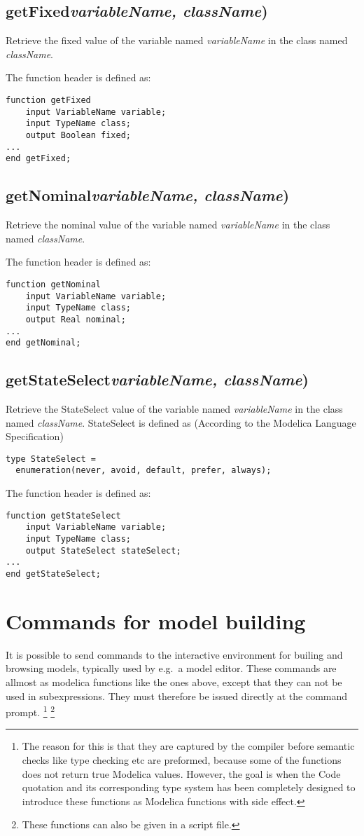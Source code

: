 \documentclass{report}
\newcommand{\func}[1]{\section{#1}}
\newcommand{\funcend}{}
\begin{document}
\func{getFixed\emph{variableName, className})}
Retrieve the fixed value of the variable named \emph{variableName} in the
class named \emph{className}. 

The function header is defined as:
\begin{verbatim}
function getFixed
    input VariableName variable;
    input TypeName class;
    output Boolean fixed;
...
end getFixed;
\end{verbatim}

\func{getNominal\emph{variableName, className})}
Retrieve the nominal value of the variable named \emph{variableName} in the
class named \emph{className}. 

The function header is defined as:
\begin{verbatim}
function getNominal
    input VariableName variable;
    input TypeName class;
    output Real nominal;
...
end getNominal;
\end{verbatim}

\func{getStateSelect\emph{variableName, className})}
Retrieve the StateSelect value of the variable named
\emph{variableName} in the class named \emph{className}. StateSelect
is defined as (According to the Modelica Language Specification)
\begin{verbatim}
type StateSelect = 
  enumeration(never, avoid, default, prefer, always);
\end{verbatim}

The function header is defined as:
\begin{verbatim}
function getStateSelect
    input VariableName variable;
    input TypeName class;
    output StateSelect stateSelect;
...
end getStateSelect;
\end{verbatim}

\funcend

\chapter{Commands for model building}
It is possible to send commands to the interactive environment for
builing and browsing models, typically used by e.g.\ a model
editor. These commands are allmost as modelica functions like the ones
above, except that they can not be used in subexpressions. They must
therefore be issued directly at the command prompt. \footnote{The reason for
this is that they are captured by the compiler before semantic checks
like type checking etc are preformed, because some of the functions
does not return true Modelica values. However, the goal is when the
Code quotation and its corresponding type system has been completely
designed to introduce these functions as Modelica functions with side
effect.} 
\footnote{These functions can also be given in a script file.}
\end{document}
